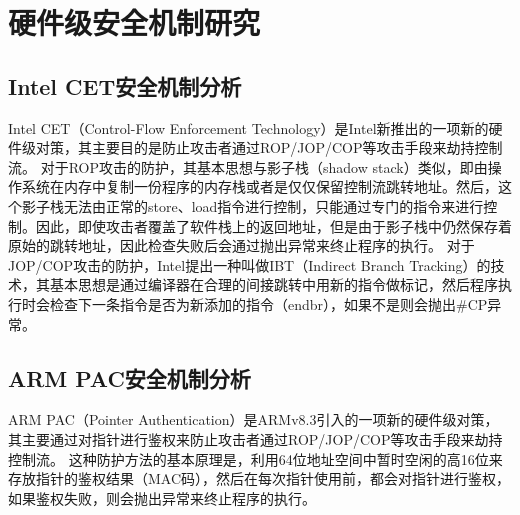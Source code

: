 %
%

\chapter{硬件级安全机制研究}\label{chap4}

\section{Intel CET安全机制分析}

Intel CET（Control-Flow Enforcement Technology）是Intel新推出的一项新的硬件级对策，其主要目的是防止攻击者通过ROP/JOP/COP等攻击手段来劫持控制流。
对于ROP攻击的防护，其基本思想与影子栈（shadow stack）类似，即由操作系统在内存中复制一份程序的内存栈或者是仅仅保留控制流跳转地址。然后，这个影子栈无法由正常的store、load指令进行控制，只能通过专门的指令来进行控制。因此，即使攻击者覆盖了软件栈上的返回地址，但是由于影子栈中仍然保存着原始的跳转地址，因此检查失败后会通过抛出异常来终止程序的执行。
对于JOP/COP攻击的防护，Intel提出一种叫做IBT（Indirect Branch Tracking）的技术，其基本思想是通过编译器在合理的间接跳转中⽤新的指令做标记，然后程序执行时会检查下一条指令是否为新添加的指令（endbr），如果不是则会抛出\#CP异常。

\section{ARM PAC安全机制分析}

ARM PAC（Pointer Authentication）是ARMv8.3引入的一项新的硬件级对策，其主要通过对指针进行鉴权来防止攻击者通过ROP/JOP/COP等攻击手段来劫持控制流。
这种防护方法的基本原理是，利用64位地址空间中暂时空闲的高16位来存放指针的鉴权结果（MAC码），然后在每次指针使用前，都会对指针进行鉴权，如果鉴权失败，则会抛出异常来终止程序的执行。